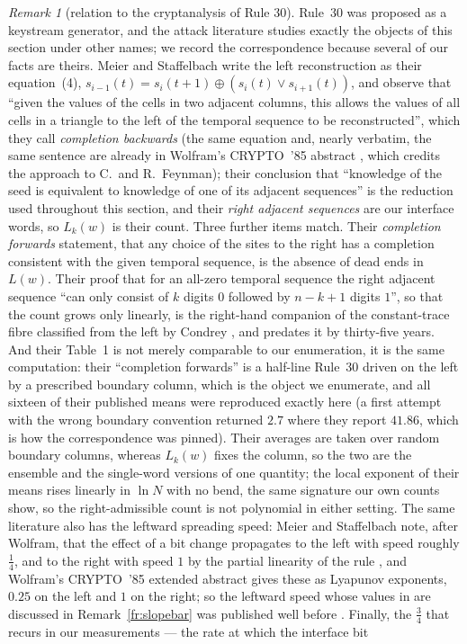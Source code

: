 \documentclass[11pt]{article}
\theoremstyle{definition}
\theoremstyle{remark}
\newtheorem{remark}[theorem]{Remark}
\begin{document}
\begin{remark}[relation to the cryptanalysis of Rule 30]\label{ex:crypto}
Rule~30 was proposed as a keystream generator, and the attack literature studies exactly the objects of
this section under other names; we record the correspondence because several of our facts are theirs.
Meier and Staffelbach \cite{MS} write the left reconstruction as their equation~(4),
$s_{i-1}(t)=s_i(t+1)\oplus(s_i(t)\vee s_{i+1}(t))$, and observe that ``given the values of the cells in two
adjacent columns, this allows the values of all cells in a triangle to the left of the temporal sequence to
be reconstructed'', which they call \emph{completion backwards} (the same equation and, nearly verbatim, the same sentence are already in Wolfram's CRYPTO~'85 abstract \cite{W85}, which credits the approach to C.~and R.~Feynman); their conclusion that ``knowledge of the
seed is equivalent to knowledge of one of its adjacent sequences'' is the reduction used throughout this
section, and their \emph{right adjacent sequences} are our interface words, so $L_k(w)$ is their count.
Three further items match. Their \emph{completion forwards} statement, that any choice of the sites to the
right has a completion consistent with the given temporal sequence, is the absence of dead ends in $L(w)$.
Their proof that for an all-zero temporal sequence the right adjacent sequence ``can only consist of $k$
digits $0$ followed by $n-k+1$ digits $1$'', so that the count grows only linearly, is the right-hand
companion of the constant-trace fibre classified from the left by Condrey \cite{Condrey}, and predates it by
thirty-five years. And their Table~1 is not merely comparable to our enumeration, it is the same computation: their ``completion forwards'' is a half-line Rule~30 driven on the left by a prescribed boundary column, which is the object we enumerate, and all sixteen of their published means were reproduced exactly here (a first attempt with the wrong boundary convention returned $2.7$ where they report $41.86$, which is how the correspondence was pinned). Their averages are taken over random boundary columns, whereas $L_k(w)$ fixes the column, so the two are the ensemble and the single-word versions of one quantity; the local exponent of their means rises linearly in $\ln N$ with no bend, the same signature our own counts show, so the right-admissible count is not polynomial in either setting. The same literature also has the leftward spreading speed: Meier and Staffelbach note, after Wolfram, that the effect of a bit change propagates to the left with speed roughly $\tfrac14$, and to the right with speed $1$ by the partial linearity of the rule \cite{MS}, and Wolfram's CRYPTO~'85 extended abstract \cite{W85} gives these as Lyapunov exponents, $0.25$ on the left and $1$ on the right; so the leftward speed whose values in \cite{NKS} are discussed in Remark~\ref{fr:slopebar} was published well before \cite{NKS}.  Finally, the $\tfrac34$ that recurs in our measurements --- the rate at which the interface bit

\end{remark}
\end{document}
